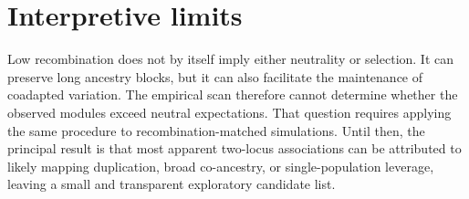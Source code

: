 \documentclass[11pt]{article}
\begin{document}
\section{Interpretive limits}\label{srD:null}

Low recombination does not by itself imply either neutrality or selection. It can preserve
long ancestry blocks, but it can also facilitate the maintenance of coadapted variation.
The empirical scan therefore cannot determine whether the observed modules exceed neutral
expectations. That question requires applying the same procedure to recombination-matched
simulations. Until then, the principal result is that most apparent two-locus associations
can be attributed to likely mapping duplication, broad co-ancestry, or single-population
leverage, leaving a small and transparent exploratory candidate list.
\end{document}
